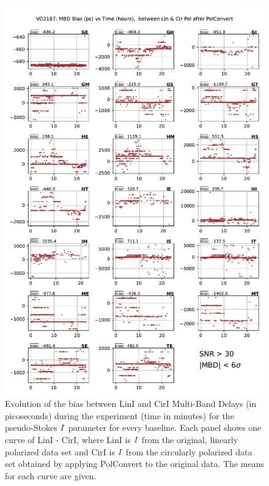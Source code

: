 \documentclass[letterpaper,twoside,12pt]{article}
\begin{document}
\begin{figure}[ht!]
  \begin{center}
  \includegraphics[width=33pc]{VO2187_MBD_bias_between_Lin_I_and_Cir_I_SNR_floor_30.pdf}
  \caption{\small Evolution of the bias between LinI and CirI Multi-Band Delays (in picoseconds) during the experiment (time in minutes) for the pseudo-Stokes $\protect I$ parameter for every baseline. Each panel shows one curve of LinI - CirI, where LinI is $\protect I$ from the original, linearly polarized data set and CirI is $\protect I$ from the circularly polarized data set obtained by applying PolConvert to the original data. The means for each curve are given.}
  \label{mbd_lin_cir_bias}
  \end{center}
\end{figure}
\end{document}

